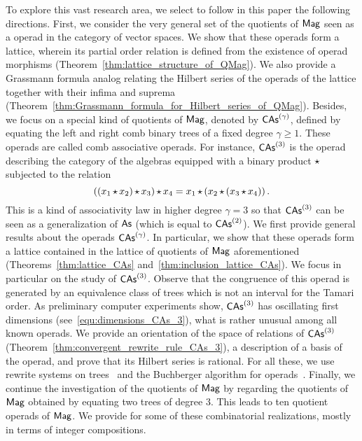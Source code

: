 To explore this vast research area, we select to follow in this paper
the following directions. First, we consider the very general set of the
quotients of $\mathsf{Mag}$ seen as a operad in the category of vector spaces.
We show that these operads form a lattice, wherein its partial order
relation is defined from the existence of operad morphisms
(Theorem~\ref{thm:lattice_structure_of_QMag}). We also provide a
Grassmann formula analog relating the Hilbert series of the operads of
the lattice together with their infima and suprema
(Theorem~\ref{thm:Grassmann_formula_for_Hilbert_series_of_QMag}).
Besides, we focus on a special kind of quotients of $\mathsf{Mag}$, denoted by
$\mathsf{CAs}^{\left(\gamma\right)}$, defined by equating the left and right comb binary trees
of a fixed degree $\gamma \geq 1$. These operads are called comb
associative operads. For instance, $\mathsf{CAs}^{\left(3\right)}$ is the operad describing
the category of the algebras equipped with a binary product $\operatorname{\star}$
subjected to the relation
\begin{equation}
    \left(\left(x_1 \operatorname{\star} x_2\right) \operatorname{\star} x_3\right) \operatorname{\star} x_4
    =
    x_1 \operatorname{\star} \left(x_2 \operatorname{\star} \left(x_3 \operatorname{\star} x_4\right)\right).
\end{equation}
This is a kind of associativity law in higher degree $\gamma = 3$ so
that $\mathsf{CAs}^{\left(3\right)}$ can be seen as a generalization of $\mathsf{As}$ (which is equal
to $\mathsf{CAs}^{\left(2\right)}$). We first provide general results about the operads
$\mathsf{CAs}^{\left(\gamma\right)}$. In particular, we show that these operads form a lattice
contained in the lattice of quotients of $\mathsf{Mag}$ aforementioned
(Theorems~\ref{thm:lattice_CAs} and~\ref{thm:inclusion_lattice_CAs}). We
focus in particular on the study of $\mathsf{CAs}^{\left(3\right)}$. Observe that the
congruence of this operad is generated by an equivalence class of trees
which is not an interval for the Tamari order. As preliminary computer
experiments show, $\mathsf{CAs}^{\left(3\right)}$ has oscillating first dimensions
(see~\eqref{equ:dimensions_CAs_3}), what is rather unusual among all
known operads. We provide an orientation of the space of relations of
$\mathsf{CAs}^{\left(3\right)}$ (Theorem~\ref{thm:convergent_rewrite_rule_CAs_3}), a
description of a basis of the operad, and prove that its Hilbert series
is rational.
%
%
For all these, we use rewrite systems on trees~\cite{BN98} and the
Buchberger algorithm for operads~\cite{DK10}. Finally, we continue the
investigation of the quotients of $\mathsf{Mag}$ by regarding the quotients of
$\mathsf{Mag}$ obtained by equating two trees of degree $3$. This leads to ten
quotient operads of $\mathsf{Mag}$. We provide for some of these combinatorial
realizations, mostly in terms of integer compositions.
\medbreak

